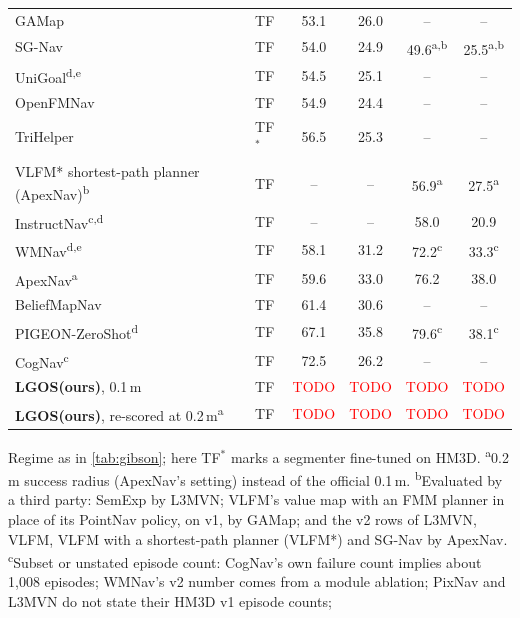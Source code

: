 \documentclass[10pt]{article}
\newcommand{\tbd}{\textcolor{red}{TODO}}
\newcommand{\ours}{LGOS\xspace}
\begin{document}
\begin{table}[tp]
\begin{tabular}{@{}llcccc@{}}
GAMap~\citep{yuan2024gamap} & TF & 53.1 & 26.0 & -- & -- \\
SG-Nav~\citep{yin2024sg} & TF & 54.0 & 24.9 & 49.6\textsuperscript{a,b} & 25.5\textsuperscript{a,b} \\
UniGoal\textsuperscript{d,e}~\citep{yin2025unigoal} & TF & 54.5 & 25.1 & -- & -- \\
OpenFMNav~\citep{kuang2024openfmnav} & TF & 54.9 & 24.4 & -- & -- \\
TriHelper~\citep{zhang2024trihelper} & TF$^{\ast}$ & 56.5 & 25.3 & -- & -- \\
VLFM* shortest-path planner (ApexNav)\textsuperscript{b}~\citep{yokoyama2024vlfm} & TF & -- & -- & 56.9\textsuperscript{a} & 27.5\textsuperscript{a} \\
InstructNav\textsuperscript{c,d}~\citep{long2024instructnav} & TF & -- & -- & 58.0 & 20.9 \\
WMNav\textsuperscript{d,e}~\citep{nie2025wmnav} & TF & 58.1 & 31.2 & 72.2\textsuperscript{c} & 33.3\textsuperscript{c} \\
ApexNav\textsuperscript{a}~\citep{zhang2025apexnav} & TF & 59.6 & 33.0 & 76.2 & 38.0 \\
BeliefMapNav~\citep{zhou2025beliefmapnav} & TF & 61.4 & 30.6 & -- & -- \\
PIGEON-ZeroShot\textsuperscript{d}~\citep{peng2025pigeon} & TF & 67.1 & 35.8 & 79.6\textsuperscript{c} & 38.1\textsuperscript{c} \\
CogNav\textsuperscript{c}~\citep{cao2025cognav} & TF & 72.5 & 26.2 & -- & -- \\
\midrule
\textbf{\ours (ours)}, 0.1\,m & TF & \tbd & \tbd & \tbd & \tbd \\
\textbf{\ours (ours)}, re-scored at 0.2\,m\textsuperscript{a} & TF & \tbd & \tbd & \tbd & \tbd \\
\bottomrule
\end{tabular}
\par\smallskip
\parbox{\linewidth}{\footnotesize Regime as in \cref{tab:gibson}; here TF$^{\ast}$ marks a segmenter fine-tuned
on HM3D. \textsuperscript{a}0.2\,m success radius (ApexNav's setting) instead of the official 0.1\,m.
\textsuperscript{b}Evaluated by a third party: SemExp by L3MVN; VLFM's value map with an FMM planner in place of its
PointNav policy, on v1, by GAMap; and the v2 rows of L3MVN, VLFM, VLFM with a shortest-path planner (VLFM*) and SG-Nav
by ApexNav. \textsuperscript{c}Subset or unstated episode count: CogNav's own failure count implies about 1{,}008
episodes; WMNav's v2 number comes from a module ablation; PixNav and L3MVN do not state their HM3D v1 episode counts;
}
\end{table}
\end{document}
